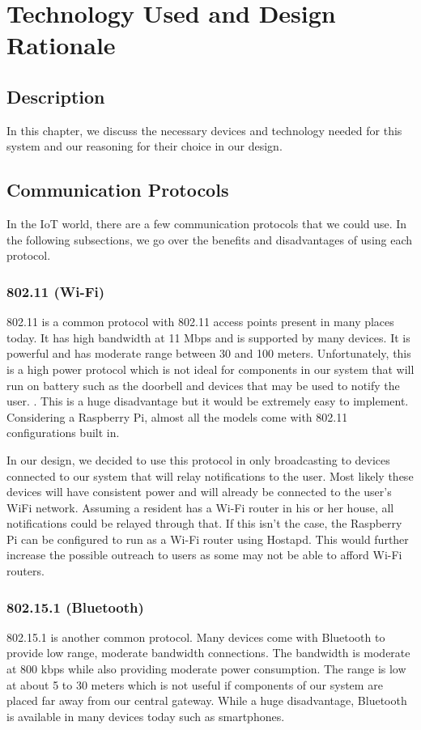 \chapter{Technology Used and Design Rationale}

\section{Description}
In this chapter, we discuss the necessary devices and technology needed for this system and our reasoning for their choice in our design.

\section{Communication Protocols}
In the IoT world, there are a few communication protocols that we could use. In the following subsections, we go over the benefits and disadvantages of using each protocol.

\subsection{802.11 (Wi-Fi)}
802.11 is a common protocol with 802.11 access points present in many places today. It has high bandwidth at 11 Mbps and is supported by many devices. It is powerful and has moderate range between 30 and 100 meters. Unfortunately, this is a high power protocol which is not ideal for components in our system that will run on battery such as the doorbell and devices that may be used to notify the user. \cite{website:bluetooth-vs-wifi}. This is a huge disadvantage but it would be extremely easy to implement. Considering a Raspberry Pi, almost all the models come with 802.11 configurations built in.

    In our design, we decided to use this protocol in only broadcasting to devices connected to our system that will relay notifications to the user. Most likely these devices will have consistent power and will already be connected to the user’s WiFi network. Assuming a resident has a Wi-Fi router in his or her house, all notifications could be relayed through that. If this isn't the case, the Raspberry Pi can be configured to run as a Wi-Fi router using Hostapd. This would further increase the possible outreach to users as some may not be able to afford Wi-Fi routers. 

\subsection{802.15.1 (Bluetooth)}
802.15.1 is another common protocol. Many devices come with Bluetooth to provide low range, moderate bandwidth connections. The bandwidth is moderate at 800 kbps while also providing moderate power consumption. The range is low at about 5 to 30 meters which is not useful if components of our system are placed far away from our central gateway. While a huge disadvantage, Bluetooth is available in many devices today such as smartphones.

